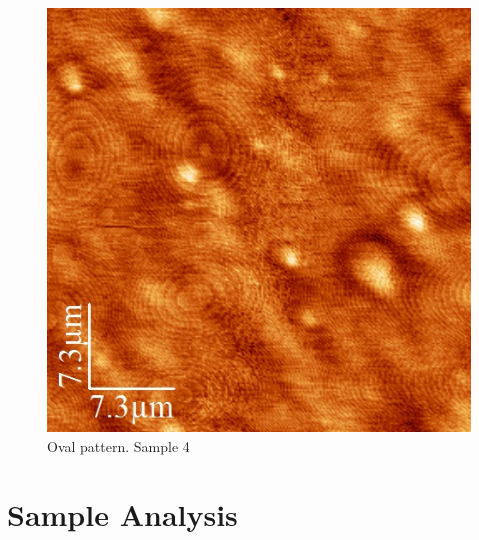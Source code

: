 \documentclass[paper=a4,fontsize=10pt,DIV=18,twocolumn,parskip=half]{scrartcl}
\numberwithin{equation}{section}    %
\begin{document}
\begin{figure}
	\begin{center}
		\includegraphics[width=0.7\columnwidth]{Bilder/artifact3}
		\caption{Oval pattern. Sample \textcircled{4}}
		\label{artifact2}
	\end{center}
\end{figure}


\section{Sample Analysis}
\end{document}
